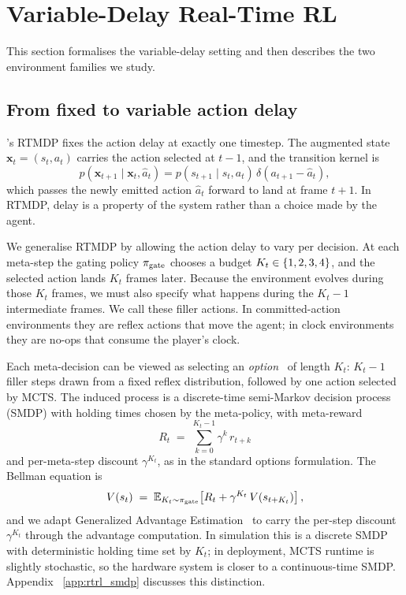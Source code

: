 \section{Variable-Delay Real-Time RL}
\label{sec:envs}

This section formalises the variable-delay setting and then describes
the two environment families we study.

\subsection{From fixed to variable action delay}

\citet{ramstedt2019rtrl}'s RTMDP fixes the action delay at exactly one
timestep.
The augmented state $\mathbf{x}_t = (s_t, a_t)$ carries the action
selected at $t{-}1$, and the transition kernel is
\begin{equation}
  p(\mathbf{x}_{t+1} \mid \mathbf{x}_t, \hat{a}_t)
  = p(s_{t+1} \mid s_t, a_t)\,\delta(a_{t+1} - \hat{a}_t),
\end{equation}
which passes the newly emitted action $\hat{a}_t$ forward to land at
frame $t{+}1$.
In RTMDP, delay is a property of the system rather than a choice made by
the agent.

We generalise RTMDP by allowing the action delay to vary per decision.
At each meta-step the gating policy $\pi_{\mathrm{gate}}$ chooses a budget
$K_t \in \{1,2,3,4\}$, and the selected action lands $K_t$ frames later.
Because the environment evolves during those $K_t$ frames, we must also
specify what happens during the $K_t{-}1$ intermediate frames. We call
these filler actions. In committed-action environments they are reflex
actions that move the agent; in clock environments they are no-ops that
consume the player's clock.

Each meta-decision can be viewed as selecting an
\emph{option}~\citep{sutton1999between,bacon2017optioncritic} of length
$K_t$: $K_t{-}1$ filler steps drawn from a fixed reflex distribution,
followed by one action selected by MCTS.
The induced process is a discrete-time semi-Markov decision process
(SMDP) with holding times chosen by the meta-policy, with meta-reward
\begin{equation}
  R_t \;=\; \sum_{k=0}^{K_t - 1} \gamma^k \, r_{t+k}
\end{equation}
and per-meta-step discount $\gamma^{K_t}$, as in the standard options
formulation. The Bellman equation is
\begin{equation}
  V(s_t)
  \;=\;
  \mathbb{E}_{K_t \sim \pi_{\mathrm{gate}}}\!\left[
    R_t + \gamma^{K_t}\, V(s_{t + K_t})
  \right],
  \label{eq:smdp}
\end{equation}
and we adapt Generalized Advantage Estimation~\citep{schulman2015high}
to carry the per-step discount $\gamma^{K_t}$ through the advantage
computation.
In simulation this is a discrete SMDP with deterministic holding time
set by $K_t$; in deployment, MCTS runtime is slightly stochastic, so
the hardware system is closer to a continuous-time SMDP. Appendix
~\ref{app:rtrl_smdp} discusses this distinction.

